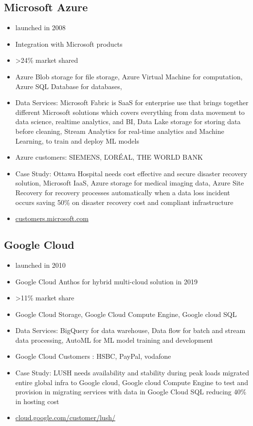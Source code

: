 \subsection{Microsoft Azure}
\begin{itemize}
    \item launched in 2008
    \item Integration with Microsoft products
    \item \textgreater 24\% market shared
    \item Azure Blob storage for file storage, Azure Virtual Machine for computation, Azure SQL Database for databases, 
    \item Data Services: Microsoft Fabric is SaaS for enterprise use that brings together different Microsoft solutions which covers everything from data movement to data science, realtime analytics, and BI, Data Lake storage for storing data before cleaning, Stream Analytics for real-time analytics and Machine Learning, to train and deploy ML models
    \item Azure customers: SIEMENS, ĽORÉAL, THE WORLD BANK
    \item Case Study: Ottawa Hospital needs cost effective and secure disaster recovery solution, Microsoft IaaS, Azure storage for medical imaging data, Azure Site Recovery for recovery processes automatically when a data loss incident occurs saving 50\% on disaster recovery cost and compliant infrastructure
    \item \url{customers.microsoft.com}
\end{itemize}

\subsection{Google Cloud}
\begin{itemize}
    \item launched in 2010
    \item Google Cloud Anthos for hybrid multi-cloud solution in 2019
    \item \textgreater 11\% market share
    \item Google Cloud Storage, Google Cloud Compute Engine, Google cloud SQL
    \item Data Services: BigQuery for data warehouse, Data flow for batch and stream data processing, AutoML for ML model training and development
    \item Google Cloud Customers : HSBC, PayPal, vodafone
    \item Case Study: LUSH needs availability and stability during peak loads migrated entire global infra to Google cloud, Google cloud Compute Engine to test and provision in migrating services with data in Google Cloud SQL reducing 40\% in hosting cost
    \item \url{cloud.google.com/customer/lush/}
\end{itemize}

